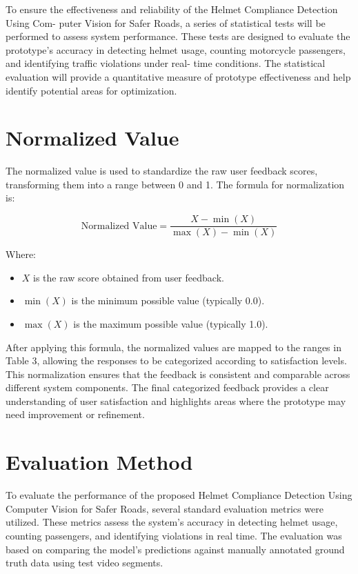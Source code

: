 \begin{refsection}
To ensure the effectiveness and reliability of the Helmet Compliance Detection Using Com- puter Vision for Safer Roads, a series of statistical tests will be performed to assess system performance. These tests are designed to evaluate the prototype’s accuracy in detecting helmet usage, counting motorcycle passengers, and identifying traffic violations under real- time conditions. The statistical evaluation will provide a quantitative measure of prototype effectiveness and help identify potential areas for optimization.

\section*{Normalized Value}
The normalized value is used to standardize the raw user feedback scores, transforming them into a range between 0 and 1. The formula for normalization is:

\begin{equation}
\text{Normalized Value} = \frac{X - \min(X)}{\max(X) - \min(X)}
\end{equation}

\noindent Where:  
\begin{itemize}
    \item $X$ is the raw score obtained from user feedback.
    \item $\min(X)$ is the minimum possible value (typically 0.0).
    \item $\max(X)$ is the maximum possible value (typically 1.0).
\end{itemize}

After applying this formula, the normalized values are mapped to the ranges in Table 3, allowing the responses to be categorized according to satisfaction levels. This normalization ensures that the feedback is consistent and comparable across different system components. The final categorized feedback provides a clear understanding of user satisfaction and highlights areas where the prototype may need improvement or refinement.

\section*{Evaluation Method}
To evaluate the performance of the proposed Helmet Compliance Detection Using Computer Vision for Safer Roads, several standard evaluation metrics were utilized. These metrics assess the system’s accuracy in detecting helmet usage, counting passengers, and identifying violations in real time. The evaluation was based on comparing the model’s predictions against manually annotated ground truth data using test video segments.


\end{refsection}
